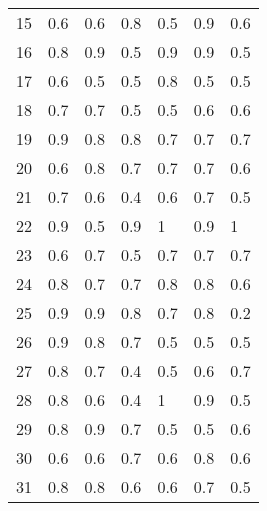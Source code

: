 \begin{table}[]
\begin{tabular}{l|lll|lll}
15              & 0.6                  & 0.6       & 0.8     & 0.5     & 0.9 & 0.6     \\
16              & 0.8                  & 0.9       & 0.5     & 0.9     & 0.9 & 0.5     \\
17              & 0.6                  & 0.5       & 0.5     & 0.8     & 0.5 & 0.5     \\
18              & 0.7                  & 0.7       & 0.5     & 0.5     & 0.6 & 0.6     \\
19              & 0.9                  & 0.8       & 0.8     & 0.7     & 0.7 & 0.7     \\
20              & 0.6                  & 0.8       & 0.7     & 0.7     & 0.7 & 0.6     \\
21              & 0.7                  & 0.6       & 0.4     & 0.6     & 0.7 & 0.5     \\
22              & 0.9                  & 0.5       & 0.9     & 1       & 0.9 & 1       \\
23              & 0.6                  & 0.7       & 0.5     & 0.7     & 0.7 & 0.7     \\
24              & 0.8                  & 0.7       & 0.7     & 0.8     & 0.8 & 0.6     \\
25              & 0.9                  & 0.9       & 0.8     & 0.7     & 0.8 & 0.2     \\
26              & 0.9                  & 0.8       & 0.7     & 0.5     & 0.5 & 0.5     \\
27              & 0.8                  & 0.7       & 0.4     & 0.5     & 0.6 & 0.7     \\
28              & 0.8                  & 0.6       & 0.4     & 1       & 0.9 & 0.5     \\
29              & 0.8                  & 0.9       & 0.7     & 0.5     & 0.5 & 0.6     \\
30              & 0.6                  & 0.6       & 0.7     & 0.6     & 0.8 & 0.6     \\
31              & 0.8                  & 0.8       & 0.6     & 0.6     & 0.7 & 0.5     \\
\end{tabular}
\end{table}
\clearpage
